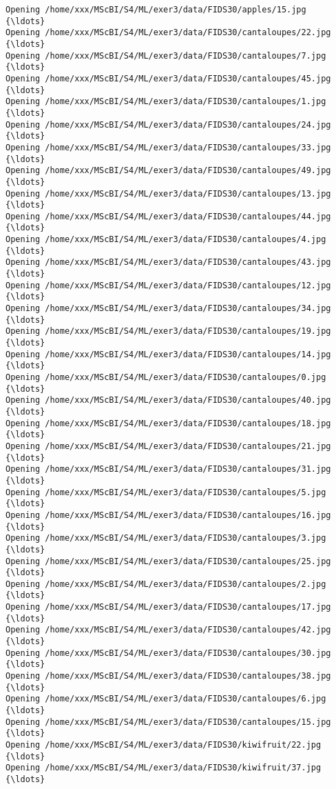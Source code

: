 \documentclass[11pt]{article}
\begin{document}
\begin{Verbatim}[commandchars=\\\{\}]
Opening /home/xxx/MScBI/S4/ML/exer3/data/FIDS30/apples/15.jpg  {\ldots}
Opening /home/xxx/MScBI/S4/ML/exer3/data/FIDS30/cantaloupes/22.jpg  {\ldots}
Opening /home/xxx/MScBI/S4/ML/exer3/data/FIDS30/cantaloupes/7.jpg  {\ldots}
Opening /home/xxx/MScBI/S4/ML/exer3/data/FIDS30/cantaloupes/45.jpg  {\ldots}
Opening /home/xxx/MScBI/S4/ML/exer3/data/FIDS30/cantaloupes/1.jpg  {\ldots}
Opening /home/xxx/MScBI/S4/ML/exer3/data/FIDS30/cantaloupes/24.jpg  {\ldots}
Opening /home/xxx/MScBI/S4/ML/exer3/data/FIDS30/cantaloupes/33.jpg  {\ldots}
Opening /home/xxx/MScBI/S4/ML/exer3/data/FIDS30/cantaloupes/49.jpg  {\ldots}
Opening /home/xxx/MScBI/S4/ML/exer3/data/FIDS30/cantaloupes/13.jpg  {\ldots}
Opening /home/xxx/MScBI/S4/ML/exer3/data/FIDS30/cantaloupes/44.jpg  {\ldots}
Opening /home/xxx/MScBI/S4/ML/exer3/data/FIDS30/cantaloupes/4.jpg  {\ldots}
Opening /home/xxx/MScBI/S4/ML/exer3/data/FIDS30/cantaloupes/43.jpg  {\ldots}
Opening /home/xxx/MScBI/S4/ML/exer3/data/FIDS30/cantaloupes/12.jpg  {\ldots}
Opening /home/xxx/MScBI/S4/ML/exer3/data/FIDS30/cantaloupes/34.jpg  {\ldots}
Opening /home/xxx/MScBI/S4/ML/exer3/data/FIDS30/cantaloupes/19.jpg  {\ldots}
Opening /home/xxx/MScBI/S4/ML/exer3/data/FIDS30/cantaloupes/14.jpg  {\ldots}
Opening /home/xxx/MScBI/S4/ML/exer3/data/FIDS30/cantaloupes/0.jpg  {\ldots}
Opening /home/xxx/MScBI/S4/ML/exer3/data/FIDS30/cantaloupes/40.jpg  {\ldots}
Opening /home/xxx/MScBI/S4/ML/exer3/data/FIDS30/cantaloupes/18.jpg  {\ldots}
Opening /home/xxx/MScBI/S4/ML/exer3/data/FIDS30/cantaloupes/21.jpg  {\ldots}
Opening /home/xxx/MScBI/S4/ML/exer3/data/FIDS30/cantaloupes/31.jpg  {\ldots}
Opening /home/xxx/MScBI/S4/ML/exer3/data/FIDS30/cantaloupes/5.jpg  {\ldots}
Opening /home/xxx/MScBI/S4/ML/exer3/data/FIDS30/cantaloupes/16.jpg  {\ldots}
Opening /home/xxx/MScBI/S4/ML/exer3/data/FIDS30/cantaloupes/3.jpg  {\ldots}
Opening /home/xxx/MScBI/S4/ML/exer3/data/FIDS30/cantaloupes/25.jpg  {\ldots}
Opening /home/xxx/MScBI/S4/ML/exer3/data/FIDS30/cantaloupes/2.jpg  {\ldots}
Opening /home/xxx/MScBI/S4/ML/exer3/data/FIDS30/cantaloupes/17.jpg  {\ldots}
Opening /home/xxx/MScBI/S4/ML/exer3/data/FIDS30/cantaloupes/42.jpg  {\ldots}
Opening /home/xxx/MScBI/S4/ML/exer3/data/FIDS30/cantaloupes/30.jpg  {\ldots}
Opening /home/xxx/MScBI/S4/ML/exer3/data/FIDS30/cantaloupes/38.jpg  {\ldots}
Opening /home/xxx/MScBI/S4/ML/exer3/data/FIDS30/cantaloupes/6.jpg  {\ldots}
Opening /home/xxx/MScBI/S4/ML/exer3/data/FIDS30/cantaloupes/15.jpg  {\ldots}
Opening /home/xxx/MScBI/S4/ML/exer3/data/FIDS30/kiwifruit/22.jpg  {\ldots}
Opening /home/xxx/MScBI/S4/ML/exer3/data/FIDS30/kiwifruit/37.jpg  {\ldots}

\end{Verbatim}
\end{document}
